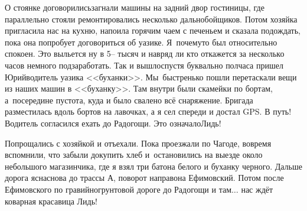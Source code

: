О стоянке договорились\mdash загнали машины на задний двор гостиницы, где параллельно стояли ремонтировались несколько дальнобойщиков. Потом хозяйка пригласила нас на кухню, напоила горячим чаем с печеньем и сказала подождать, пока она попробует договориться об уазике. Я~почему\sdash то был относительно спокоен. Это выльется ну в 5\thinspace\nobreakdash-- тысяч и навряд ли кто откажется за несколько часов немного подзаработать. Так и вышло\mdash спустя буквально полчаса пришел Юрий\mdash водитель уазика <<буханки>>. Мы~быстренько пошли перетаскали вещи из наших машин в <<буханку>>. Там внутри были скамейки по бортам, а~посередине пустота, куда и было свалено всё снаряжение. Бригада разместилась вдоль бортов на лавочках, а я сел спереди и достал GPS. В путь! Водитель согласился ехать до Радогощи. Это означало\mdash Лидь!

Попрощались с хозяйкой и отъехали. Пока проезжали по Чагоде, вовремя вспомнили, что забыли докупить хлеб и~остановились на выезде около небольшого магазинчика, где я взял три батона белого и буханку черного. Дальше дорога ясна\mdash снова до трассы А, поворот направо\mdash на Ефимовский. Потом после Ефимовского по гравийно\sdash грунтовой дороге до Радогощи и там$\ldots$ нас ждёт коварная красавица Лидь!

\begin{center}
\end{center}